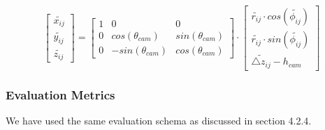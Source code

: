         \begin{equation}
            \begin{bmatrix}\widetilde{x_{ij}}  \\\widetilde{y_{ij}} \\ \widetilde{z_{ij}}  \end{bmatrix} = \begin{bmatrix}1 & 0 & 0  \\ 0  & cos(\theta_{cam}) & sin(\theta_{cam}) \\ 0  & -sin(\theta_{cam}) & cos(\theta_{cam}) \end{bmatrix} \cdot \begin{bmatrix}\widetilde{r_{ij}} \cdot cos(\widetilde{\phi_{ij}})  \\\widetilde{r_{ij}} \cdot sin(\widetilde{\phi_{ij}})  \\ \widetilde{\triangle z_{ij}} - h_{cam} \end{bmatrix}
        \end{equation}
        

        \subsubsection{Evaluation Metrics}
        We have used the same evaluation schema as discussed in section 4.2.4. 
        

